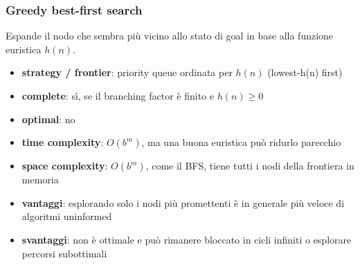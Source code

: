 \subsubsection*{Greedy best-first search}
Espande il nodo che sembra più vicino allo stato di goal in base alla funzione euristica \(h(n)\).
\begin{itemize}
	\item \textbf{strategy / frontier}: priority queue ordinata per \(h(n)\) (lowest-h(n) first)
	\item \textbf{complete}: sì, se il branching factor è finito e \(h(n) \geq 0\)
	\item \textbf{optimal}: no
	\item \textbf{time complexity}: \(O(b^{m})\), ma una buona euristica può ridurlo parecchio
	\item \textbf{space complexity}: \(O(b^{m})\), come il BFS, tiene tutti i nodi della frontiera in memoria
	\item \textbf{vantaggi}: esplorando solo i nodi più promettenti è in generale più veloce di algoritmi uninformed
	\item \textbf{svantaggi}: non è ottimale e può rimanere bloccato in cicli infiniti o esplorare percorsi subottimali
\end{itemize}

